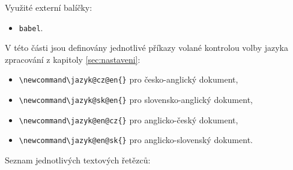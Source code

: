 Využité externí balíčky:

\begin{itemize}[label=-]
	\item \verb|babel|.
\end{itemize}

V této části jsou definovány jednotlivé příkazy volané kontrolou volby jazyka zpracování z kapitoly \ref{sec:nastaveni}:

\begin{itemize}[label=-]
	\item \verb|\newcommand\jazyk@cz@en{}| pro česko-anglický dokument,
	\item \verb|\newcommand\jazyk@sk@en{}| pro slovensko-anglický dokument,
	\item \verb|\newcommand\jazyk@en@cz{}| pro anglicko-český dokument,
	\item \verb|\newcommand\jazyk@en@sk{}| pro anglicko-slovenský dokument.
\end{itemize}

Seznam jednotlivých textových řetězců:

